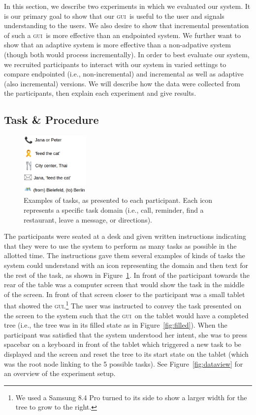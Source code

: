 \documentclass[11pt]{article}
\newcommand{\ui}[0]{\textsc{gui}}
\begin{document}
In this section, we describe two experiments in which we evaluated our system. It is our primary goal to show that our \ui\ is useful to the user and signals understanding to the users. We also desire to show that incremental presentation of such a \ui\ is more effective than an endpointed system. We further want to show that an adaptive system is more effective than a non-adpative system (though both would process incrementally). In order to best evaluate our system, we recruited participants to interact with our system in varied settings to compare endpointed (i.e., non-incremental) and incremental as well as adaptive (also incremental) versions. We will describe how the data were collected from the participants, then explain each experiment and give results.

\subsection{Task \& Procedure} 


\begin{figure}
  \centering
      \includegraphics[width=0.3\textwidth]{figures/taskexample.png}	
      \caption{Examples of tasks, as presented to each participant. Each icon represents a specific task domain (i.e., call, reminder, find a restaurant, leave a message, or directions).\label{fig:taskex}}
\end{figure}

The participants were seated at a desk and given written instructions indicating that they were to use the system to perform as many tasks as possible in the allotted time. The instructions gave them several examples of kinds of tasks the system could understand with an icon representing the domain and then text for the rest of the task, as shown in Figure~\ref{fig:taskex}. In front of the participant towards the rear of the table was a computer screen that would show the task in the middle of the screen. In front of that screen closer to the participant was a small tablet that showed the \ui.\footnote{We used a Samsung 8.4 Pro turned to its side to show a larger width for the tree to grow to the right.} The user was instructed to convey the task presented on the screen to the system such that the \ui\ on the tablet would have a completed tree (i.e., the tree was in its filled state as in Figure~\ref{fig:filled}). When the participant was satisfied that the system understood her intent, she was to press spacebar on a keyboard in front of the tablet which triggered a new task to be displayed and the screen and reset the tree to its start state on the tablet (which was the root node linking to the 5 possible tasks). See Figure~\ref{fig:dataview} for an overview of the experiment setup.
\end{document}
